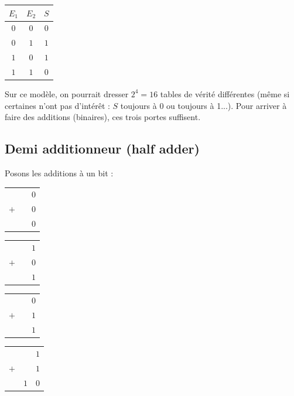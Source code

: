 \begin{center}
\begin{multicols}{3}
\medskip


\medskip

\begin{tabular}{cc|c}
$E_1$ & $E_2$ & $S$ \\
\hline
$0$ & $0$ & $0$ \\
$0$ & $1$ & $1$\\
$1$ & $0$ & $1$ \\
$1$ & $1$ & $0$\\
\end{tabular}
\end{multicols}
\end{center}

Sur ce modèle, on pourrait dresser $2^4=16$ tables de vérité différentes (même si certaines n'ont pas d'intérêt : $S$ toujours à 0 ou toujours à 1...). Pour arriver à faire des additions (binaires), ces trois portes suffisent.

\subsection{Demi additionneur (half adder)}

Posons les additions à un bit :

\begin{center}
\begin{multicols}{4}
\begin{tabular}{ccc}
    &   & $0$ \\
$+$ &   & $0$ \\
\hline
    &   & $0$\\
\end{tabular}


\begin{tabular}{ccc}
    &   & $1$ \\
$+$ &   & $0$ \\
\hline
    &   & $1$\\
\end{tabular}


\begin{tabular}{ccc}
    &   & $0$ \\
$+$ &   & $1$ \\
\hline
    &   & $1$\\
\end{tabular}


\begin{tabular}{ccc}
    &   & $1$ \\
$+$ &   & $1$ \\
\hline
    &$1$& $0$\\
\end{tabular}
\end{multicols}
\end{center}

